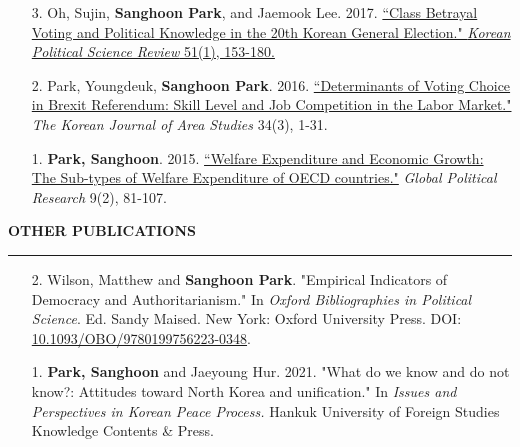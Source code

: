 \documentclass[
  16,
]{article}
\begin{document}
\begin{itemize}
\item[3.] Oh, Sujin, \textbf{Sanghoon Park}, and Jaemook Lee. 2017. \href{http://www.dbpia.co.kr/Journal/ArticleDetail/NODE07131578?TotalCount=1&Seq=1&q=%5B%EC%9D%B4%EC%9E%AC%EB%AC%B5%20%EC%98%A4%EC%88%98%EC%A7%84%20%EB%B0%95%EC%83%81%ED%9B%88%20%EA%B3%84%EA%B8%89%ED%88%AC%ED%91%9C%C2%A7coldb%C2%A72%C2%A751%C2%A73%5D&searchWord=%EC%A0%84%EC%B2%B4%3D%5E%24%EC%9D%B4%EC%9E%AC%EB%AC%B5%20%EC%98%A4%EC%88%98%EC%A7%84%20%EB%B0%95%EC%83%81%ED%9B%88%20%EA%B3%84%EA%B8%89%ED%88%AC%ED%91%9C%5E*&Multimedia=0&isIdentifyAuthor=0&Collection=0&SearchAll=%EC%9D%B4%EC%9E%AC%EB%AC%B5%20%EC%98%A4%EC%88%98%EC%A7%84%20%EB%B0%95%EC%83%81%ED%9B%88%20%EA%B3%84%EA%B8%89%ED%88%AC%ED%91%9C&isFullText=0&specificParam=0&SearchMethod=0&Sort=1&SortType=desc&Page=1&PageSize=20#}{``Class Betrayal Voting and Political Knowledge in the 20th Korean General Election." \textit{Korean Political Science Review} 51(1), 153-180.}
\item[2.] Park, Youngdeuk, \textbf{Sanghoon Park}. 2016. \href{http://kiss.kstudy.com/thesis/thesis-view.asp?key=3472800}{``Determinants of Voting Choice in Brexit Referendum: Skill Level and Job Competition in the Labor Market."} \textit{The Korean Journal of Area Studies} 34(3), 1-31. 
\item[1.] \textbf{Park, Sanghoon}. 2015. \href{http://search.koreanstudies.net/thesis/thesis-view.asp?key=3438155}{``Welfare Expenditure and Economic Growth: The Sub-types of Welfare Expenditure of OECD countries."} \textit{Global Political Research} 9(2), 81-107.    
\end{itemize}

\vspace{-0.16cm}

\vspace{7pt}

\begin{large}{\bf OTHER PUBLICATIONS}
  \vspace{3pt}
  \hrule
\end{large}
\begin{itemize}
  \item[2.] Wilson, Matthew and \textbf{Sanghoon Park}. "Empirical Indicators of Democracy and Authoritarianism." In {\it Oxford Bibliographies in Political Science}. Ed. Sandy Maised. New York: Oxford University Press. DOI: \href{https://www.oxfordbibliographies.com/display/document/obo-9780199756223/obo-9780199756223-0348.xml}{10.1093/OBO/9780199756223-0348}.
    \item[1.] \textbf{Park, Sanghoon} and Jaeyoung Hur. 2021. "What do we know and do not know?: Attitudes toward North Korea and unification." In {\it Issues and Perspectives in Korean Peace Process.} Hankuk University of Foreign Studies Knowledge Contents \& Press.
\end{itemize}
\vspace{-0.16cm}
\end{document}
